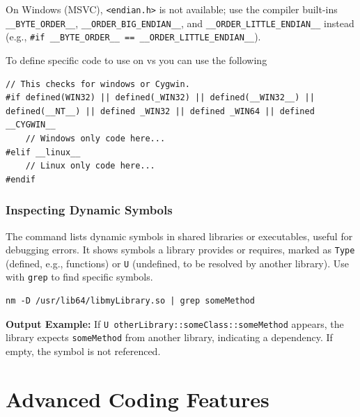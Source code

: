 On Windows (MSVC), \texttt{<endian.h>} is not available; use the compiler built-ins \texttt{\_\_BYTE\_ORDER\_\_}, \texttt{\_\_ORDER\_BIG\_ENDIAN\_\_}, and \texttt{\_\_ORDER\_LITTLE\_ENDIAN\_\_} instead (e.g., \texttt{\#if \_\_BYTE\_ORDER\_\_ == \_\_ORDER\_LITTLE\_ENDIAN\_\_}).

To define specific code to use on  vs  you can use the following
\begin{lstlisting}
// This checks for windows or Cygwin.
#if defined(WIN32) || defined(_WIN32) || defined(__WIN32__) || defined(__NT__) || defined _WIN32 || defined _WIN64 || defined __CYGWIN__
	// Windows only code here...
#elif __linux__
	// Linux only code here...
#endif
\end{lstlisting}


\subsubsection{Inspecting Dynamic Symbols}
The  command lists dynamic symbols in shared libraries or executables, useful for debugging  errors. It shows symbols a library provides or requires, marked as \texttt{Type} (defined, e.g., functions) or \texttt{U} (undefined, to be resolved by another library). Use with \texttt{grep} to find specific symbols.

\begin{lstlisting}[style=terminalstyle]
nm -D /usr/lib64/libmyLibrary.so | grep someMethod
\end{lstlisting}

\textbf{Output Example:} If \texttt{U otherLibrary::someClass::someMethod} appears, the library expects \texttt{someMethod} from another library, indicating a dependency. If empty, the symbol is not referenced.

























\section{Advanced Coding Features}

